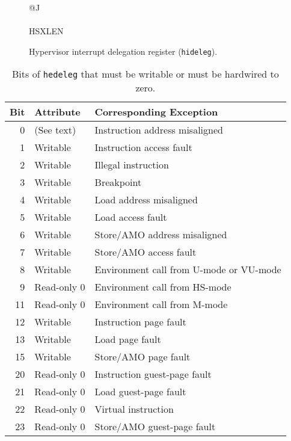 \begin{figure}[h!]
{\footnotesize
\begin{center}
\begin{tabular}{@{}J}
 \\
\hline
{} \\
\hline
HSXLEN \\
\end{tabular}
\end{center}
}
\vspace{-0.1in}
\caption{Hypervisor interrupt delegation register ({\tt hideleg}).}
\label{hidelegreg}
\end{figure}

\begin{table*}[h!]
\begin{center}
\begin{tabular}{|r|l|l|}
\hline
Bit & Attribute   & Corresponding Exception \\
\hline
 0  & (See text)  & Instruction address misaligned \\
 1  & Writable    & Instruction access fault \\
 2  & Writable    & Illegal instruction \\
 3  & Writable    & Breakpoint \\
 4  & Writable    & Load address misaligned \\
 5  & Writable    & Load access fault \\
 6  & Writable    & Store/AMO address misaligned \\
 7  & Writable    & Store/AMO access fault \\
 8  & Writable    & Environment call from U-mode or VU-mode \\
 9  & Read-only 0 & Environment call from HS-mode \\
11  & Read-only 0 & Environment call from M-mode \\
12  & Writable    & Instruction page fault \\
13  & Writable    & Load page fault \\
15  & Writable    & Store/AMO page fault \\
20  & Read-only 0 & Instruction guest-page fault \\
21  & Read-only 0 & Load guest-page fault \\
22  & Read-only 0 & Virtual instruction \\
23  & Read-only 0 & Store/AMO guest-page fault \\
\hline
\end{tabular}
\end{center}
\caption{Bits of {\tt hedeleg} that must be writable or must be hardwired
to zero.}
\label{tab:hedeleg-bits}
\end{table*}

